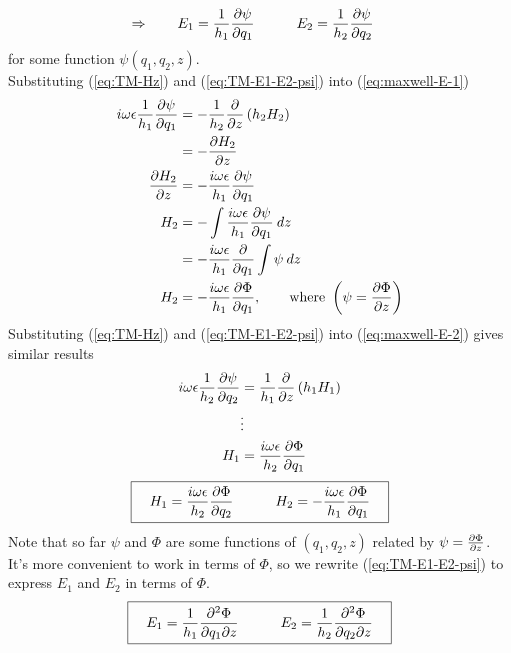 \documentclass[twoside, a4paper]{article}
\begin{document}
\begin{equation}
\label{eq:TM-E1-E2-psi}
\Rightarrow
\quad \quad
\displaystyle E_1 = \frac{1}{h_1} \frac{\partial \psi}{\partial q_1}
\quad \quad \quad 
E_2 = \frac{1}{h_2} \frac{\partial \psi}{\partial q_2} 
\quad
\end{equation}
for some function $\psi(q_1, q_2, z)$.\\

Substituting (\ref{eq:TM-Hz}) and (\ref{eq:TM-E1-E2-psi}) into (\ref{eq:maxwell-E-1}) 
\begin{align*}
i \omega \epsilon \frac{1}{h_1} \frac{\partial \psi}{\partial q_1} & = 
-\frac{1}{h_2} \frac{\partial }{\partial z} \left( h_2 H_2 \right) \\
& = -\frac{\partial H_2}{\partial z} \\
\frac{\partial H_2}{\partial z} & = 
-\frac{i \omega \epsilon}{h_1} \frac{\partial \psi}{\partial q_1} \\
H_2
& = - \int \frac{i \omega \epsilon}{h_1} \frac{\partial \psi}{\partial q_1} \: dz \\
& = - \frac{i \omega \epsilon}{h_1} \frac{\partial }{\partial q_1} \int \psi \: dz  \\
H_2 & = - \frac{i \omega \epsilon}{h_1} \frac{\partial \Phi}{\partial q_1} ,
\quad \quad \mbox{where } \left( \psi = \frac{\partial \Phi}{\partial z} \right)
\end{align*}
Substituting (\ref{eq:TM-Hz}) and (\ref{eq:TM-E1-E2-psi}) into (\ref{eq:maxwell-E-2}) gives similar results
\begin{align*}
i \omega \epsilon \frac{1}{h_2} \frac{\partial \psi}{\partial q_2} & = 
\frac{1}{h_1} \frac{\partial }{\partial z} \left( h_1 H_1 \right) \\
& \vdots \\
H_1 & = \frac{i \omega \epsilon}{h_2} \frac{\partial \Phi}{\partial q_1} 
\end{align*}
\begin{equation}
\label{eq:TM-H1-H2}
\boxed{ \quad
H_1 = \frac{i \omega \epsilon}{h_2} \frac{\partial \Phi}{\partial q_2} 
\quad \quad \quad 
H_2  = - \frac{i \omega \epsilon}{h_1} \frac{\partial \Phi}{\partial q_1} 
\quad }
\end{equation}
Note that so far $\psi$ and $\Phi$ are some functions of $\left(q_1,q_2,z\right)$ related by $\psi = \frac{\partial \Phi}{\partial z}$. It's more convenient to work in terms of $\Phi$, so we rewrite (\ref{eq:TM-E1-E2-psi}) to express $E_1$ and $E_2$ in terms of $\Phi$.
\begin{equation}
\label{eq:TM-E1-E2}
\boxed{
\quad
E_1 = \frac{1}{h_1} \frac{\partial^2 \Phi}{\partial q_1 \partial z}
\quad \quad \quad
E_2 = \frac{1}{h_2} \frac{\partial^2 \Phi}{\partial q_2 \partial z}
\quad
}
\end{equation}
\end{document}
